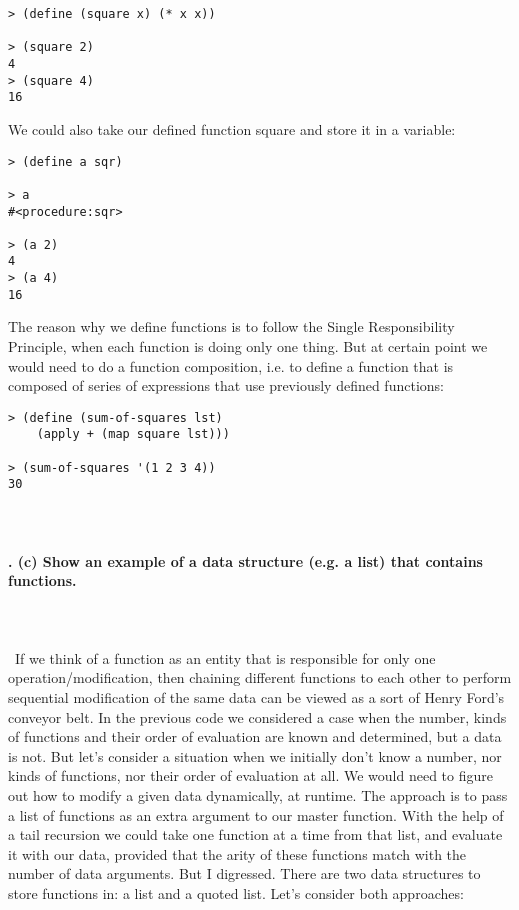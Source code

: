 \documentclass{article}
\begin{document}
\begin{verbatim} 
> (define (square x) (* x x))

> (square 2)
4
> (square 4)
16
\end{verbatim}

We could also take our defined function square and store it in a variable:

\begin{verbatim} 
> (define a sqr)

> a
#<procedure:sqr>

> (a 2)
4
> (a 4)
16
\end{verbatim}

The reason why we define functions is to follow the Single Responsibility Principle, when each function is doing only one thing. But at certain point we would need to do a function composition, i.e. to define a function that is composed of series of expressions that use previously defined functions:

\begin{verbatim} 
> (define (sum-of-squares lst)
    (apply + (map square lst)))
    
> (sum-of-squares '(1 2 3 4))
30
\end{verbatim}

\paragraph{}\
\paragraph{. (c) Show an example of a data structure (e.g. a list) that contains functions.}\
\paragraph{}\
If we think of a function as an entity that is responsible for only one operation/modification, then chaining different functions to each other to perform sequential modification of the same data can be viewed as a sort of Henry Ford's conveyor belt. In the previous code we considered a case when the number, kinds of functions and their order of evaluation are known and determined, but a data is not. But let's consider a situation when we initially don't know a number, nor kinds of functions, nor their order of evaluation at all. We would need to figure out how to modify a given data dynamically, at runtime. The approach is to pass a list of functions as an extra argument to our master function. With the help of a tail recursion we could take one function at a time from that list, and evaluate it with our data, provided that the arity of these functions match with the number of data arguments. But I digressed. There are two data structures to store functions in: a list and a quoted list. Let's consider both approaches:
\end{document}
